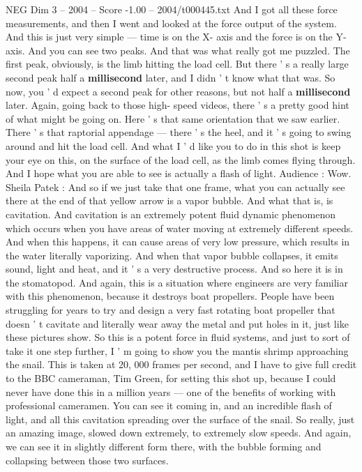 \begin{textsample}{NEG Dim 3 – 2004 – Score -1.00 – 2004/t000445.txt}
And I got all these force measurements, and then I went and looked at the force output of the system.
And this is just very simple — time is on the X- axis and the force is on the Y-axis.
And you can see two peaks.
And that was what really got me puzzled.
The first peak, obviously, is the limb hitting the load cell.
But there ' s a really large second peak half a \textbf{millisecond} later, and I didn ' t know what that was.
So now, you ' d expect a second peak for other reasons, but not half a \textbf{millisecond} later.
Again, going back to those high- speed videos, there ' s a pretty good hint of what might be going on.
Here ' s that same orientation that we saw earlier.
There ' s that raptorial appendage — there ' s the heel, and it ' s going to swing around and hit the load cell.
And what I ' d like you to do in this shot is keep your eye on this, on the surface of the load cell, as the limb comes flying through.
And I hope what you are able to see is actually a flash of light.
Audience : Wow.
Sheila Patek : And so if we just take that one frame, what you can actually see there at the end of that yellow arrow is a vapor bubble.
And what that is, is cavitation.
And cavitation is an extremely potent fluid dynamic phenomenon which occurs when you have areas of water moving at extremely different speeds.
And when this happens, it can cause areas of very low pressure, which results in the water literally vaporizing.
And when that vapor bubble collapses, it emits sound, light and heat, and it ' s a very destructive process.
And so here it is in the stomatopod.
And again, this is a situation where engineers are very familiar with this phenomenon, because it destroys boat propellers.
People have been struggling for years to try and design a very fast rotating boat propeller that doesn ' t cavitate and literally wear away the metal and put holes in it, just like these pictures show.
So this is a potent force in fluid systems, and just to sort of take it one step further, I ' m going to show you the mantis shrimp approaching the snail.
This is taken at 20, 000 frames per second, and I have to give full credit to the BBC cameraman, Tim Green, for setting this shot up, because I could never have done this in a million years — one of the benefits of working with professional cameramen.
You can see it coming in, and an incredible flash of light, and all this cavitation spreading over the surface of the snail.
So really, just an amazing image, slowed down extremely, to extremely slow speeds.
And again, we can see it in slightly different form there, with the bubble forming and collapsing between those two surfaces.

\end{textsample}
